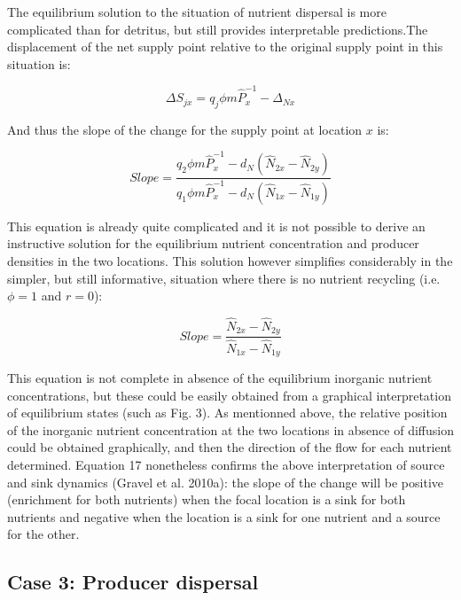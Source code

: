 \documentclass[12pt]{paper}
\begin{document}
	The equilibrium solution to the situation of nutrient dispersal is more complicated than for detritus, but still provides interpretable predictions.The displacement of the net supply point relative to the original supply point in this situation is:

\begin{equation}
	\label{e:bnet}
	\Delta S_{jx}=q_{j}\phi m\widehat{P}_{x}^{-1}-\Delta_{Nx}
\end{equation}

And thus the slope of the change for the supply point at location $x$ is:

\begin{equation}
	\label{e:bnet}
	Slope=\frac{q_{2}\phi m\widehat{P}_{x}^{-1}-d_{N}(\widehat{N}_{2x}-\widehat{N}_{2y})}{q_{1}\phi m\widehat{P}_{x}^{-1}-d_{N}(\widehat{N}_{1x}-\widehat{N}_{1y})}
\end{equation}

	This equation is already quite complicated and it is not possible to derive an instructive solution for the equilibrium nutrient concentration and producer densities in the two locations. This solution however simplifies considerably in the simpler, but still informative, situation where there is no nutrient recycling (i.e. $\phi = 1$ and $r = 0$):

\begin{equation}
	\label{e:bnet}
	Slope=\frac{\widehat{N}_{2x}-\widehat{N}_{2y}}{\widehat{N}_{1x}-\widehat{N}_{1y}}
\end{equation}

This equation is not complete in absence of the equilibrium inorganic nutrient concentrations, but these could be easily obtained from a graphical interpretation of equilibrium states (such as Fig. 3). As mentionned above, the relative position of the inorganic nutrient concentration at the two locations in absence of diffusion could be obtained graphically, and then the direction of the flow for each nutrient determined. Equation 17 nonetheless confirms the above interpretation of source and sink dynamics (Gravel et al. 2010a): the slope of the change will be positive (enrichment for both nutrients) when the focal location is a sink for both nutrients and negative when the location is a sink for one nutrient and a source for the other.

\subsection{Case 3: Producer dispersal}
\end{document}
